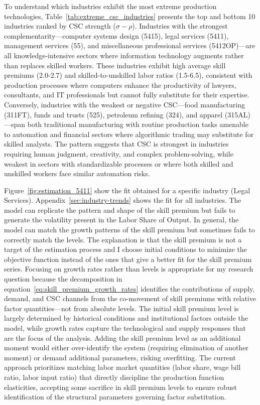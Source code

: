 \documentclass[12pt]{article}
\begin{document}
To understand which industries exhibit the most extreme production technologies, Table~\ref{tab:extreme_csc_industries} presents the top and bottom 10 industries ranked by CSC strength ($\sigma - \rho$). Industries with the strongest complementarity---computer systems design (5415), legal services (5411), management services (55), and miscellaneous professional services (5412OP)---are all knowledge-intensive sectors where information technology augments rather than replaces skilled workers. These industries exhibit high average skill premiums (2.0-2.7) and skilled-to-unskilled labor ratios (1.5-6.5), consistent with production processes where computers enhance the productivity of lawyers, consultants, and IT professionals but cannot fully substitute for their expertise. Conversely, industries with the weakest or negative CSC---food manufacturing (311FT), funds and trusts (525), petroleum refining (324), and apparel (315AL)---span both traditional manufacturing with routine production tasks amenable to automation and financial sectors where algorithmic trading may substitute for skilled analysts. The pattern suggests that CSC is strongest in industries requiring human judgment, creativity, and complex problem-solving, while weakest in sectors with standardizable processes or where both skilled and unskilled workers face similar automation risks.



Figure~\ref{fig:estimation_5411} show the fit obtained for a specific industry (Legal Services). Appendix~\ref{sec:industry-trends} shows the fit for all industries. The model can replicate the pattern and shape of the skill premium but fails to generate the volatility present in the Labor Share of Output. In general, the model can match the growth patterns of the skill premium but sometimes fails to correctly match the levels. The explanation is that the skill premium is not a target of the estimation process and I choose initial conditions to minimize the objective function instead of the ones that give a better fit for the skill premium series. Focusing on growth rates rather than levels is appropriate for my research question because the decomposition in equation~\eqref{eq:skill_premium_growth_rates} identifies the contributions of supply, demand, and CSC channels from the co-movement of skill premiums with relative factor quantities---not from absolute levels. The initial skill premium level is largely determined by historical conditions and institutional factors outside the model, while growth rates capture the technological and supply responses that are the focus of the analysis. Adding the skill premium level as an additional moment would either over-identify the system (requiring elimination of another moment) or demand additional parameters, risking overfitting. The current approach prioritizes matching labor market quantities (labor share, wage bill ratio, labor input ratio) that directly discipline the production function elasticities, accepting some sacrifice in skill premium levels to ensure robust identification of the structural parameters governing factor substitution.
\end{document}

